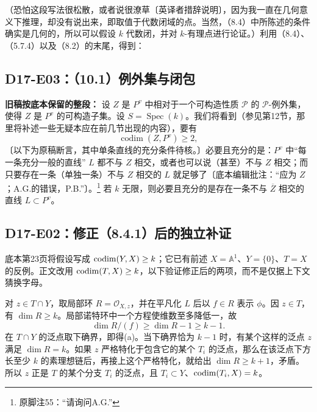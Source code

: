 （恐怕这段写法很松散，或者说很潦草〔英译者措辞说明〕，因为我一直在几何意义下推理，却没有说出来，即取值于代数闭域的点。当然，（8.4）中所陈述的条件确实是几何的，所以可以假设 $k$ 代数闭，并对 $k$-有理点进行论证。）利用（8.4）、（5.7.4）以及（8.2）的末尾，得到：


\subsection*{D17-E03：（10.1）例外集与闭包}
\noindent\textbf{旧稿按底本保留的整段：}
设 $Z$ 是 $P^v$ 中相对于一个可构造性质 $\mathcal P$ 的 $\mathcal P$-例外集，使得 $Z$ 是 $P^v$ 的可构造子集。设 $S=\operatorname{Spec}(k)$。我们将看到（参见第12节，那里将补述一些无疑本应在前几节出现的内容），要有
\[
\operatorname{codim}(Z,P^v)\ge2,
\]
〔以下为原稿断言，其中单条直线的充分条件待核。〕必要且充分的是：$P^v$ 中“每一条充分一般的直线” $L$ 都不与 $Z$ 相交，或者也可以说（甚至）不与 $Z$ 相交；而只要存在一条（单独一条）不与 $Z$ 相交的 $L$ 就足够了〔底本编辑批注：“应为 $Z$；A.G.的错误，P.B.”〕。\footnote{原脚注55：“请询问A.G.”}
若 $k$ 无限，则必要且充分的是存在一条不与 $\overline Z$ 相交的直线 $L\subset P^v$。

\subsection*{D17-E02：修正（8.4.1）后的独立补证}
底本第23页将假设写成 $\operatorname{codim}(Y,X)\geq k$；它已有前述 $X=\mathbb A^1$、$Y=\{0\}$、$T=X$ 的反例。正文改用 $\operatorname{codim}(T,X)\geq k$，以下验证修正后的两项，而不是仅据上下文猜换字母。

对 $z\in T\cap Y$，取局部环 $R=\mathcal O_{X,z}$，并在平凡化 $L$ 后以 $f\in R$ 表示 $\phi$。因 $z\in T$，有 $\dim R\geq k$。局部诺特环中一个方程使维数至多降低一，故
\[
\dim R/(f)\geq\dim R-1\geq k-1.
\]
在 $T\cap Y$ 的泛点取下确界，即得(a)。当下确界恰为 $k-1$ 时，有某个这样的泛点 $z$ 满足 $\dim R=k$。如果 $z$ 严格特化于包含它的某个 $T_i$ 的泛点，那么在该泛点下方长至少 $k$ 的素理想链后，再接上这个严格特化，就给出 $\dim R\geq k+1$，矛盾。所以 $z$ 正是 $T$ 的某个分支 $T_i$ 的泛点，且 $T_i\subset Y$、$\operatorname{codim}(T_i,X)=k$。

